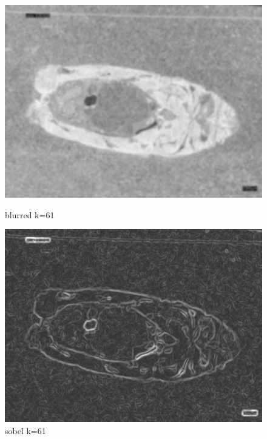\begin{figure}
    \centering
    \begin{minipage}{0.45\textwidth}
        \centering
        \includegraphics[width=\textwidth]{./fig/gausssian/blurred61.jpg}
        \caption{blurred k=61}
        \label{fig:blurred61}
    \end{minipage}
    \begin{minipage}{0.45\textwidth}
        \centering
        \includegraphics[width=\textwidth]{./fig/gausssian/sobel61.jpg}
        \caption{sobel k=61}
        \label{fig:sobel61}
    \end{minipage}
\end{figure}

